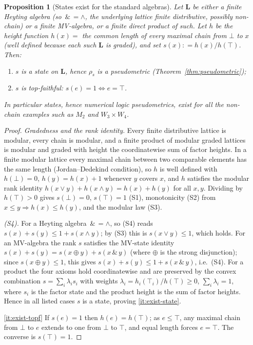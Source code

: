 \documentclass{amsart}
\theoremstyle{definition}
\theoremstyle{plain}
\newtheorem{proposition}{Proposition}
\newcommand{\eqdef}{\mathrel{\mathop:}=}
\newcommand{\bL}{\mathbf{L}}
\newcommand{\odotop}{\,\&\,}
\newcommand{\Top}{\top}
\newcommand{\Bot}{\bot}
\begin{document}
\begin{proposition}[States exist for the standard algebras]\label{prop:exist}
Let $\bL$ be either a finite Heyting algebra \emph{(}so $\odotop=\wedge$, the
underlying lattice finite distributive, possibly non-chain\emph{)} or a finite
MV-algebra, or a finite direct product of such.  Let $h$ be the height function
$h(x)=$ the common length of every maximal chain from $\Bot$ to $x$ \emph{(}well
defined because each such $\bL$ is graded\emph{)}, and set
$s(x)\eqdef h(x)/h(\Top)$.  Then:
\begin{enumerate}
\item\label{it:exist-state} $s$ is a state on $\bL$, hence $\rho_s$ is a
pseudometric \emph{(Theorem~\ref{thm:pseudometric})};
\item\label{it:exist-topf} $s$ is \emph{top-faithful}: $s(e)=1\iff e=\Top$.
\end{enumerate}
In particular states, hence numerical logic pseudometrics, exist for all the
non-chain examples such as $M_2$ and $W_3\times W_4$.
\end{proposition}

\begin{proof}
\emph{Gradedness and the rank identity.}  Every finite distributive lattice is
modular, every chain is modular, and a finite product of modular graded lattices
is modular and graded with height the coordinatewise sum of factor heights.  In a
finite modular lattice every maximal chain between two comparable elements has the
same length (Jordan--Dedekind condition), so $h$ is well defined with
$h(\Bot)=0$, $h(y)=h(x)+1$ whenever $y$ covers $x$, and $h$ satisfies the modular
rank identity $h(x\vee y)+h(x\wedge y)=h(x)+h(y)$ for all $x,y$.  Dividing by
$h(\Top)>0$ gives $s(\Bot)=0$, $s(\Top)=1$ (S1), monotonicity (S2) from
$x\le y\Rightarrow h(x)\le h(y)$, and the modular law (S3).

\emph{(S4).}  For a Heyting algebra $\odotop=\wedge$, so (S4) reads
$s(x)+s(y)\le 1+s(x\wedge y)$; by (S3) this is $s(x\vee y)\le 1$, which holds.
For an MV-algebra the rank $s$ satisfies the MV-state identity
$s(x)+s(y)=s(x\oplus y)+s(x\odotop y)$ (where $\oplus$ is the strong
disjunction); since $s(x\oplus y)\le 1$, this gives
$s(x)+s(y)\le 1+s(x\odotop y)$, i.e.\ (S4).  For a product the four axioms hold
coordinatewise and are preserved by the convex combination
$s=\sum_i \lambda_i s_i$ with weights $\lambda_i=h_i(\Top_i)/h(\Top)\ge0$,
$\sum_i\lambda_i=1$, where $s_i$ is the factor state and the product height is the
sum of factor heights.  Hence in all listed cases $s$ is a state, proving
\eqref{it:exist-state}.

\eqref{it:exist-topf} If $s(e)=1$ then $h(e)=h(\Top)$; as $e\le\Top$, any maximal
chain from $\Bot$ to $e$ extends to one from $\Bot$ to $\Top$, and equal length
forces $e=\Top$.  The converse is $s(\Top)=1$.
\end{proof}
\end{document}
